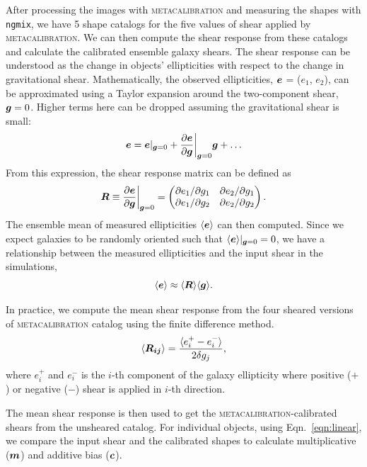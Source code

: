 \documentclass[fleqn,usenatbib]{mnras}
\begin{document}
After processing the images with \textsc{metacalibration} and measuring the shapes with \texttt{ngmix}, we have 5 shape catalogs for the five values of shear applied by \textsc{metacalibration}. We can then compute the shear response from these catalogs and calculate the calibrated ensemble galaxy shears. The shear response can be understood as the change in objects' ellipticities with respect to the change in gravitational shear. Mathematically, the observed ellipticities, $\vb*{e}$ = ($e_{1}$, $e_{2}$), can be approximated using a Taylor expansion around the two-component shear, $\vb*{g}=0$. Higher terms here can be dropped assuming the gravitational shear is small: 
\begin{equation}
    \vb*{e} = \vb*{e}\rvert_{\vb*{g}=0} + \frac{\partial \vb*{e}}{\partial \vb*{g}}\bigg\rvert_{\vb*{g}=0}\vb*{g} + \ldots
\end{equation}
From this expression, the shear response matrix can be defined as 
\begin{equation}
    \vb*{R} \equiv \frac{\partial \vb*{e}}{\partial \vb*{g}}\bigg\rvert_{\vb*{g}=0} = 
    \begin{pmatrix}
        \partial e_{1}/\partial g_{1} & \partial e_{2}/\partial g_{1} \\ 
        \partial e_{1}/\partial g_{2} & \partial e_{2}/\partial g_{2}
    \end{pmatrix}. 
\end{equation}
The ensemble mean of measured ellipticities $\langle\vb*{e}\rangle$ can then computed. Since we expect galaxies to be randomly oriented such that $\langle\vb*{e}\rangle\rvert_{\vb*{g}=0}=0$, we have a relationship between the measured ellipticities and the input shear in the simulations, 
\begin{equation}
    \langle\vb*{e}\rangle \approx \langle \vb*{R}\rangle\langle\vb*{g} \rangle. 
\end{equation} 


In practice, we compute the mean shear response from the four sheared versions of \textsc{metacalibration} catalog using the finite difference method. 
\begin{equation}
    \langle\vb*{R_{ij}}\rangle = 
    \frac{\langle e^{+}_{i} - e^{-}_{i} \rangle}{2\delta g_{j}}, 
\end{equation}
where $e^{+}_{i}$ and $e^{-}_{i}$ is the $i$-th component of the galaxy ellipticity where positive ($+$) or negative ($-$) shear is applied in $i$-th direction. 

The mean shear response is then used to get the \textsc{metacalibration}-calibrated shears from the unsheared catalog. For individual objects, using Eqn.~\eqref{eqn:linear}, we compare the input shear and the calibrated shapes to calculate multiplicative ($\vb*{m}$) and additive bias ($\vb*{c}$).
\end{document}
